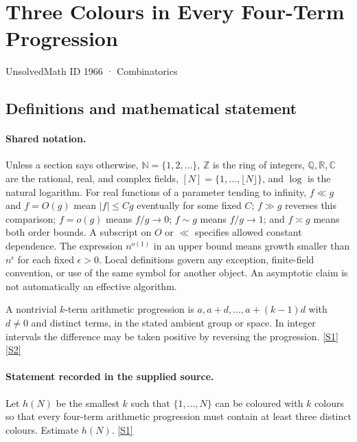\documentclass[11pt,a4paper]{article}
\newcommand{\N}{\mathbb{N}}
\newcommand{\Z}{\mathbb{Z}}
\newcommand{\Q}{\mathbb{Q}}
\newcommand{\R}{\mathbb{R}}
\newcommand{\C}{\mathbb{C}}
\newcommand{\sref}[2]{\hyperlink{source:#1:#2}{[S#2]}}
\begin{document}

\setcounter{section}{1965}

\section{Three Colours in Every Four-Term Progression}\label{1966}

{\small\sffamily UnsolvedMath ID 1966 · Combinatorics}

\subsection{Definitions and mathematical statement}

\paragraph{Shared notation.}Unless a section says otherwise, $\N=\{1,2,\ldots\}$,
$\Z$ is the ring of integers, $\Q,\R,\C$ are the rational, real, and complex
fields, $[N]=\{1,\ldots,\lfloor N\rfloor\}$, and $\log$ is the natural
logarithm. For real functions of a parameter tending to infinity,
$f\ll g$ and $f=O(g)$ mean $|f|\leq Cg$ eventually for some fixed $C$;
$f\gg g$ reverses this comparison; $f=o(g)$ means $f/g\to0$;
$f\sim g$ means $f/g\to1$; and $f\asymp g$ means both order bounds.
A subscript on $O$ or $\ll$ specifies allowed constant dependence.
The expression $n^{o(1)}$ in an upper bound means growth smaller than
$n^\epsilon$ for each fixed $\epsilon>0$. Local definitions govern any
exception, finite-field convention, or use of the same symbol for another
object. An asymptotic claim is not automatically an effective algorithm.



A nontrivial $k$-term arithmetic progression is $a,a+d,\ldots,a+(k-1)d$ with $d\ne0$ and distinct terms, in the stated ambient group or space. In integer intervals the difference may be taken positive by reversing the progression. \sref{1966}{1} \sref{1966}{2}

\paragraph{Statement recorded in the supplied source.}
Let $h(N)$ be the smallest $k$ such that $\{1,\ldots,N\}$ can be coloured with $k$ colours so that every four-term arithmetic progression must contain at least three distinct colours. Estimate $h(N)$. \sref{1966}{1}
\end{document}
